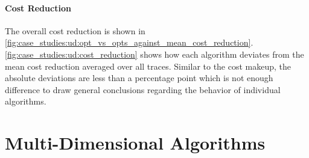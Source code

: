 \paragraph{Cost Reduction} The overall cost reduction is shown in \autoref{fig:case_studies:ud:opt_vs_opts_against_mean_cost_reduction}. \autoref{fig:case_studies:ud:cost_reduction} shows how each algorithm deviates from the mean cost reduction averaged over all traces. Similar to the cost makeup, the absolute deviations are less than a percentage point which is not enough difference to draw general conclusions regarding the behavior of individual algorithms.

\section{Multi-Dimensional Algorithms}
